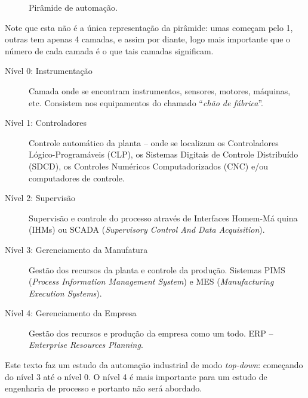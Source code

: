 \begin{figure}[htb]
\begin{center}
\begin{tikzpicture}[y=0.80pt, x=0.8pt,xscale=0.4,yscale=-0.4, inner sep=0pt, outer sep=0pt]
\end{tikzpicture}
	\end{center}
	\caption{Pirâmide de automação.}
	\label{fig:piramide}
\end{figure}

Note que esta não é a única representação da pirâmide: umas começam pelo 1, outras tem apenas 4 camadas, e assim por diante, logo mais importante que o número de cada camada é o que tais camadas significam.

\begin{description}
	\item[Nível 0: Instrumentação] Camada onde se encontram instrumentos, sensores, motores,
máquinas, etc. Consistem nos equipamentos do chamado ``\emph{chão de fábrica}''.
\item[Nível 1: Controladores] Controle automático da planta -- onde se localizam os Controladores
Lógico-Programáveis (CLP), os Sistemas Digitais de Controle Distribuído (SDCD), os Controles Numéricos Computadorizados (CNC) e/ou computadores de controle.
\item[Nível 2: Supervisão] Supervisão e controle do processo através de Interfaces Homem-Má
quina (IHMs) ou SCADA (\emph{Supervisory Control And Data Acquisition}).
\item[Nível 3: Gerenciamento da Manufatura] Gestão dos recursos da planta e controle da produção.  Sistemas PIMS
(\emph{Process Information Management System}) e MES (\emph{Manufacturing Execution Systems}).
\item[Nível 4: Gerenciamento da Empresa] Gestão dos recursos e produção da empresa como um todo. ERP –
\emph{Enterprise Resources Planning}.
\end{description}

Este texto faz um estudo da automação industrial de modo \emph{top-down}: começando do nível 3 até o nível 0. O nível 4 é mais importante para um estudo de engenharia de processo e portanto não será abordado.